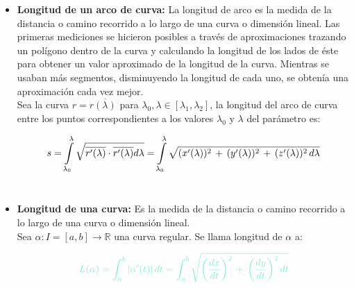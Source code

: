 \documentclass[letterpaper, 12pt]{article}
\begin{document}
    \begin{itemize}\renewcommand{\labelitemi}{$\otimes$}
            
        \item \textbf{Longitud de un arco de curva:} La longitud de arco es la medida de la distancia o camino recorrido a lo largo de una curva o dimensión lineal. Las primeras mediciones se hicieron posibles a través de aproximaciones trazando un polígono dentro de la curva y calculando la longitud de los lados de éste para obtener un valor aproximado de la longitud de la curva. Mientras se usaban más segmentos, disminuyendo la longitud de cada uno, se obtenía una aproximación cada vez mejor.  \\
        
        Sea la curva $r=r\overline{(\lambda)}$ para $\lambda_{0}, \lambda \in [\lambda_{1}, \lambda_{2}]$, la longitud del arco de curva entre los puntos correspondientes a los valores $\lambda_{0}$ y $\lambda$ del parámetro es:
        
            \begin{equation*}
                s = \int\limits_{\lambda_{0}}^{\lambda} \sqrt{\overline{r'(\lambda)} \cdot \overline{r'(\lambda)} d\lambda} = \int\limits_{\lambda_{0}}^{\lambda} \sqrt{(x'(\lambda))^{2} \thinspace + \thinspace (y'(\lambda))^{2} \thinspace + \thinspace (z'(\lambda))^{2} \thinspace d\lambda}
            \end{equation*}\\
            
        \item \textbf{Longitud de una curva:} Es la medida de la distancia o camino recorrido a lo largo de una curva o dimensión lineal.\\
        
        Sea $\alpha : I = [a,b] \rightarrow \mathds{R}$ una curva regular. Se llama longitud de $\alpha$ a:
        
            \begin{equation*}
                \textcolor{mygreen}{L(\alpha) = \int_{a}^{b} \arrowvert \alpha '(t) \arrowvert \thinspace dt = \int_{a}^{b} \sqrt{\left( \frac{dx}{dt} \right)^{2} \thinspace + \thinspace \left( \frac{dy}{dt} \right)^{2} dt }}
            \end{equation*}\\
            
    \end{itemize}
\end{document}
